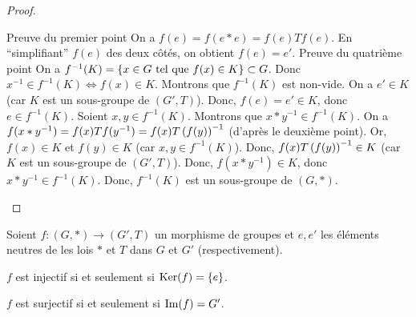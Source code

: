 \documentclass[12pt,a4paper]{report}
\begin{document}
\begin{proof}
    \begin{outline}
        \1 Preuve du premier point
            \2 On a $f(e) = f(e * e) = f(e) T f(e)$.
            \2 En ``simplifiant'' $f(e)$ des deux côtés, on obtient $f(e) = e'$.
        \1 Preuve du quatrième point
            \2 On a $f^{-1}(K) = \{x\in G \text{ tel que } f(x) \in K\} \subset G$.
            \2 Donc $x^{-1} \in f^{-1}(K) \iff f(x) \in K$.
            \2 Montrons que $f^{-1}(K)$ est non-vide.
                \3 On a $e' \in K$ (car $K$ est un sous-groupe de $(G',T)$).
                \3 Donc, $f(e) = e' \in K$, donc $e \in f^{-1}(K)$.
            \2 Soient $x,y \in f^{-1}(K)$. Montrons que $x * y^{-1} \in f^{-1}(K)$.
                \3 On a $f(x*y^{-1}) = f(x) T f(y^{-1}) = f(x) T \left(f(y)\right)^{-1}$ (d'après le deuxième point).
                \3 Or, $f(x) \in K$ et $f(y) \in K$ (car $x,y \in f^{-1}(K)$).
                \3 Donc, $f(x) T \left(f(y)\right)^{-1} \in K$ (car $K$ est un sous-groupe de $(G',T)$).
                \3 Donc, $f(x*y^{-1}) \in K$, donc $x * y^{-1} \in f^{-1}(K)$.
            \2 Donc, $f^{-1}(K)$ est un sous-groupe de $(G,*)$.
    \end{outline}
\end{proof}

\begin{property}
    Soient $f:(G,*)\to(G',T)$ un morphisme de groupes et $e, e'$ les éléments neutres de les lois $*$ et $T$ dans $G$ et $G'$ (respectivement).
    
    $f$ est injectif si et seulement si $\mathrm{Ker}(f) = \{e\}$.

    $f$ est surjectif si et seulement si $\mathrm{Im}(f) = G'$.
\end{property}
\end{document}
